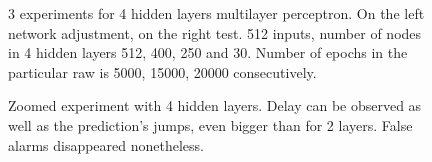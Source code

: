 \begin{figure}[H]
	\begin{center}
	\end{center}
	\caption{3 experiments for 4 hidden layers multilayer perceptron. On the left network adjustment, on the right test. 512 inputs, number of nodes in 4 hidden layers 512, 400, 250 and 30. Number of epochs in the particular raw is 5000, 15000, 20000 consecutively.}

	\label{fig:nn_raw_4_hidden_512_400__250_30_1_5000_150000_20000}
\end{figure}
\begin{figure}[H]
	\begin{center}
	\end{center}
	\caption{Zoomed experiment with 4 hidden layers. Delay can be observed as well as the prediction's jumps, even bigger than for 2 layers. False alarms disappeared nonetheless.}

	\label{fig:nn_raw_4_hidden_512_400__250_30_1_5000_150000_20000_zoomed}
\end{figure}

